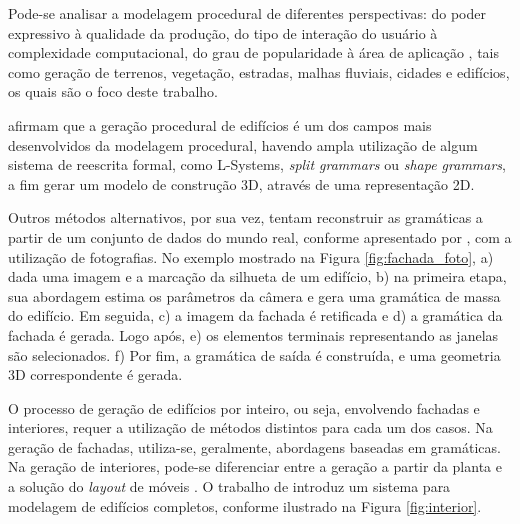 Pode-se analisar a modelagem procedural de diferentes perspectivas: do poder expressivo à qualidade da produção, do tipo de interação do usuário à complexidade computacional, do grau de popularidade à área de aplicação \cite{smelik2014}, tais como geração de terrenos, vegetação, estradas, malhas fluviais, cidades e edifícios, os quais são o foco deste trabalho.

 afirmam que a geração procedural de edifícios é um dos campos mais desenvolvidos da modelagem procedural, havendo ampla utilização de algum sistema de reescrita formal, como \gls{L-Systems}, \textit{split grammars} ou \textit{shape grammars}, a fim gerar um modelo de construção 3D, através de uma representação 2D.

Outros métodos alternativos, por sua vez, tentam reconstruir as gramáticas a partir de um conjunto de dados do mundo real, conforme apresentado por , com a utilização de fotografias. No exemplo mostrado na Figura \ref{fig:fachada_foto}, a) dada uma imagem e a marcação da silhueta de um edifício, b) na primeira etapa, sua abordagem estima os parâmetros da câmera e gera uma gramática de massa do edifício. Em seguida, c) a imagem da fachada é retificada e d) a gramática da fachada é gerada. Logo após, e) os elementos terminais representando as janelas são selecionados. f) Por fim, a gramática de saída é construída, e uma geometria 3D correspondente é gerada.

\begin{figure}[h!]
	\centering
	\captionsetup{width=15cm}
	{}	
\end{figure}

O processo de geração de edifícios por inteiro, ou seja, envolvendo fachadas e interiores, requer a utilização de métodos distintos para cada um dos casos. Na geração de fachadas, utiliza-se, geralmente, abordagens baseadas em gramáticas. Na geração de interiores, pode-se diferenciar entre a geração a partir da planta e a solução do \textit{layout} de móveis \cite{smelik2014}. O trabalho de  introduz um sistema para modelagem de edifícios completos, conforme ilustrado na Figura \ref{fig:interior}.

